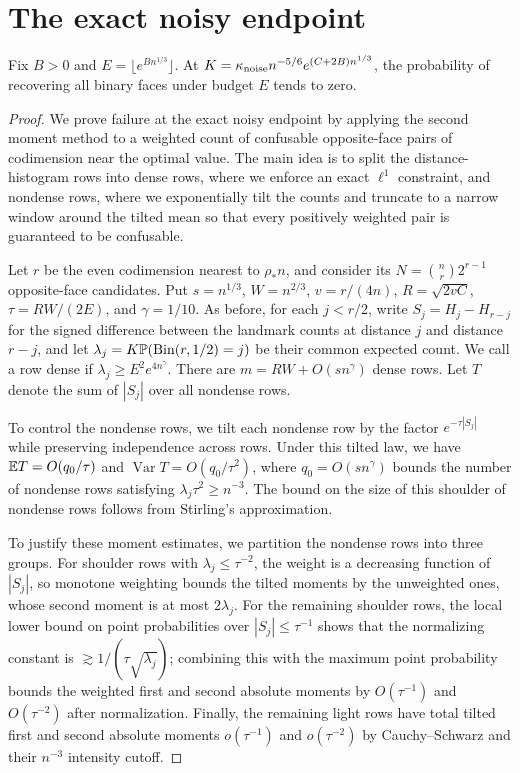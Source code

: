 \section{The exact noisy endpoint}\label{sec:noisy-exact}
\begin{theorem}\label{thm:noisy-exact}
Fix \(B>0\) and \(E=\lfloor e^{Bn^{1/3}}\rfloor\). At
\(K=\kappa_{\rm noise}n^{-5/6}e^{(C+2B)n^{1/3}}\), the probability
of recovering all binary faces under budget \(E\) tends to zero.
\end{theorem}

\begin{proof}
We prove failure at the exact noisy endpoint by applying the second moment
method to a weighted count of confusable opposite-face pairs of codimension
near the optimal value. The main idea is to split the distance-histogram rows
into dense rows, where we enforce an exact \(\ell^1\) constraint, and nondense
rows, where we exponentially tilt the counts and truncate to a narrow window
around the tilted mean so that every positively weighted pair is guaranteed to
be confusable.

Let \(r\) be the even codimension nearest to \(\rho_*n\), and consider its
\(N=\binom nr2^{r-1}\) opposite-face candidates.
Put \(s=n^{1/3}\), \(W=n^{2/3}\), \(v=r/(4n)\),
\(R=\sqrt{2vC}\), \(\tau=RW/(2E)\), and \(\gamma=1/10\).
As before, for each \(j<r/2\), write \(S_j=H_j-H_{r-j}\) for the signed
difference between the landmark counts at distance \(j\) and distance \(r-j\),
and let \(\lambda_j=K\mathbb P(\operatorname{Bin}(r,1/2)=j)\) be their common expected count.
We call a row dense if \(\lambda_j\ge E^2e^{4n^\gamma}\).
There are \(m=RW+O(sn^\gamma)\) dense rows. Let \(T\) denote the
sum of \(|S_j|\) over all nondense rows.

To control the nondense rows, we tilt each nondense row by the factor
\(e^{-\tau |S_j|}\) while preserving independence across rows. Under this
tilted law, we have \(\mathbb E T=O(q_0/\tau)\) and
\(\operatorname{Var}T=O(q_0/\tau^2)\), where \(q_0=O(sn^\gamma)\) bounds the
number of nondense rows satisfying \(\lambda_j\tau^2\ge n^{-3}\). The bound on
the size of this shoulder of nondense rows follows from Stirling's
approximation.

To justify these moment estimates, we partition the nondense rows into three
groups. For shoulder rows with \(\lambda_j\le\tau^{-2}\), the weight is a
decreasing function of \(|S_j|\), so monotone weighting bounds the tilted
moments by the unweighted ones, whose second moment is at most \(2\lambda_j\).
For the remaining shoulder rows, the local lower bound on point probabilities
over \(|S_j|\le\tau^{-1}\) shows that the normalizing constant is
\(\gtrsim1/(\tau\sqrt{\lambda_j})\); combining this with the maximum point
probability bounds the weighted first and second absolute moments by
\(O(\tau^{-1})\) and \(O(\tau^{-2})\) after normalization. Finally, the
remaining light rows have total tilted first and second absolute moments
\(o(\tau^{-1})\) and \(o(\tau^{-2})\) by Cauchy--Schwarz and their
\(n^{-3}\) intensity cutoff.


\end{proof}
